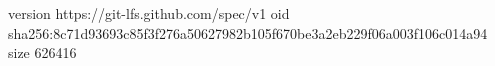 version https://git-lfs.github.com/spec/v1
oid sha256:8c71d93693c85f3f276a50627982b105f670be3a2eb229f06a003f106c014a94
size 626416
